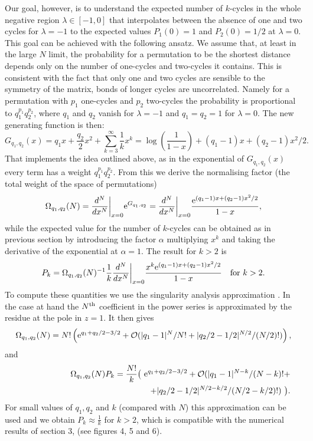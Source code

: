 \documentclass[]{iopart}
\def\ee{{\rm e}}
\begin{document}
Our goal, however, is to understand the expected number of $k$-cycles
in the whole negative region $\lambda\in[-1,0]$ that interpolates
between the absence of one and two cycles for $\lambda=-1$ 
to the expected values $P_1(0)=1$ and $P_2(0)=1/2$ at $\lambda=0$.
This goal can be achieved with the following ansatz.
We assume that, at least in the large $N$ limit, the probability for a 
permutation to be the 
shortest distance depends only on the number of one-cycles and 
two-cycles it contains.
This is consistent with the fact that only one and two cycles
are sensible to the symmetry of the matrix, bonds of longer
cycles are uncorrelated.
Namely for a permutation with $p_1$ one-cycles and
$p_2$ two-cycles the probability is proportional
to $q_1^{p_1}q_2^{p_2}$, where $q_1$ and $q_2$ vanish
for $\lambda=-1$ and $q_1=q_2=1$ for $\lambda=0$.
The new generating function is then:
$$G_{q_1,q_2}(x)=q_1x+\frac{q_2}{2}x^2+\sum_{k=3}^\infty \frac1k x^k=
\log\left(\frac1{1-x}\right)+(q_1-1)x+(q_2-1)x^2/2.$$
That implements the idea outlined above, as in the exponential 
of $G_{q_1,q_2}(x)$ every term has a weight
$q_1^{p_1}q_2^{p_2}$.
{}From this we derive the normalising factor
(the total weight of the space of permutations)
\begin{eqnarray}
\Omega_{q_1,q_2}(N)
=\frac{d^N}{dx^N}\bigg\vert_{x=0}\ee^{G_{q_1,q_2}}
= \frac{d^N}{dx^N}\bigg\vert_{x=0}\frac{\ee^{(q_1-1)x+(q_2-1)x^2/2}}{1-x},
\end{eqnarray}
while the expected value for the number of $k$-cycles can be 
obtained as in previous section by introducing the factor $\alpha$
multiplying $x^k$ and taking the derivative of the exponential 
at $\alpha=1$.
The result for $k>2$ is
\begin{equation}\label{kcycles}
P_k=\Omega_{q_1,q_2}(N)^{-1}\frac1k
\frac{d^N}{dx^N}\bigg\vert_{x=0}
\frac{x^k\ee^{(q_1-1)x+(q_2-1)x^2/2}}{1-x}\quad\mbox{for}\ {k>2}.
\end{equation}
To compute these quantities we use the singularity analysis
approximation \cite{Flajolet}. In the case at hand the $N^{\rm th}$ 
coefficient in the power series is approximated by the residue at 
the pole in $z=1$. It then gives
$$\Omega_{q_1,q_2}(N)=
N!\left(\ee^{q_1+q_2/2-3/2}+{\cal O}(|q_1-1|^N/N!+
|q_2/2-1/2|^{N/2}/{(N/2)!})\right),$$
and 
\begin{eqnarray}\label{qpk}
&&\hskip -.7cm\Omega_{q_1,q_2}(N)P_k=\frac{N!}k \big(\ \ee^{q_1+q_2/2-3/2}+
{\cal O}(|q_1-1|^{N-k}/(N-k)!+&\cr
&&\hskip 5.7cm+|q_2/2-1/2|^{N/2-k/2}/{(N/2-k/2)!})\ \big).
\end{eqnarray}
For small values of $q_1,q_2$ and $k$ (compared with $N$) this approximation 
can be used and we obtain $P_k\approx\frac1k$ for $k>2$, which is compatible 
with the numerical results of section 3, (see figures 4, 5 and 6). 
\end{document}
